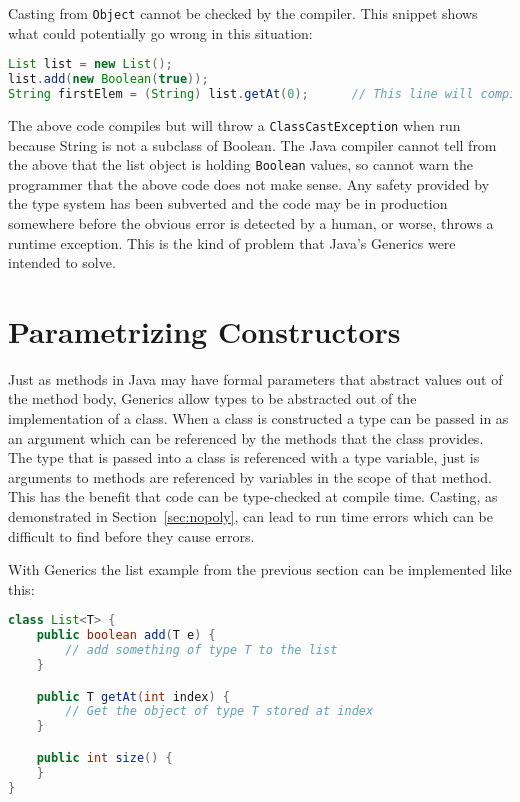Casting from \lstinline{Object} cannot be checked by the compiler. This snippet
shows what could potentially go wrong in this situation:

\begin{lstlisting}[nolol, language=Java, label={lst:casterr}]
List list = new List();
list.add(new Boolean(true));
String firstElem = (String) list.getAt(0);      // This line will compile
\end{lstlisting}

The above code compiles but will throw a \lstinline{ClassCastException} when
run because String is not a subclass of Boolean. The Java compiler cannot tell
from the above that the list object is holding \lstinline{Boolean} values, so
cannot warn the programmer that the above code does not make sense. Any safety
provided by the type system has been subverted and the code may be in
production somewhere before the obvious error is detected by a human, or worse,
throws a runtime exception. This is the kind of problem that Java's Generics
were intended to solve.

\section{Parametrizing Constructors}
Just as methods in Java may have formal parameters that abstract values out of
the method body, Generics allow types to be abstracted out of the
implementation of a class. When a class is constructed a type can be passed in
as an argument which can be referenced by the methods that the class provides.
The type that is passed into a class is referenced with a type variable, just
is arguments to methods are referenced by variables in the scope of that
method.  This has the benefit that code can be type-checked at compile time.
Casting, as demonstrated in Section~\ref{sec:nopoly}, can lead to run
time errors which can be difficult to find before they cause errors.

With Generics the list example from the previous section can be implemented
like this:

\begin{lstlisting}[caption={List class with Generics}, language=Java, label={lst:genericlist}]
class List<T> {
    public boolean add(T e) {
        // add something of type T to the list
    }

    public T getAt(int index) {
        // Get the object of type T stored at index
    }

    public int size() {
    }
}
\end{lstlisting}

